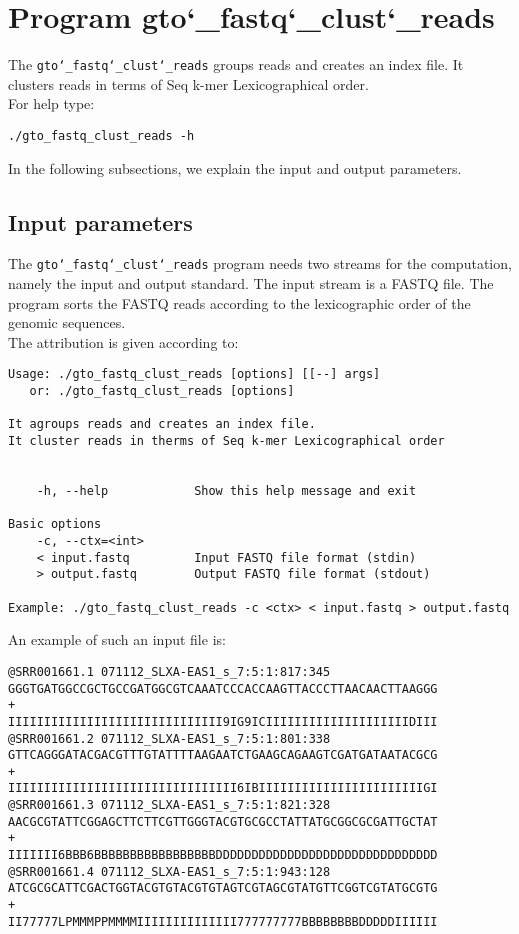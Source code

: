 \section{Program gto\char`_fastq\char`_clust\char`_reads}
The \texttt{gto\char`_fastq\char`_clust\char`_reads} groups reads and creates an index file. It clusters reads in terms of Seq k-mer Lexicographical order.\\
For help type:
\begin{lstlisting}
./gto_fastq_clust_reads -h
\end{lstlisting}
In the following subsections, we explain the input and output parameters.

\subsection*{Input parameters}

The \texttt{gto\char`_fastq\char`_clust\char`_reads} program needs two streams for the computation, namely the input and output standard. The input stream is a FASTQ file. The program sorts the FASTQ reads according to the lexicographic order of the genomic sequences.\\
The attribution is given according to:
\begin{lstlisting}
Usage: ./gto_fastq_clust_reads [options] [[--] args]
   or: ./gto_fastq_clust_reads [options]

It agroups reads and creates an index file.
It cluster reads in therms of Seq k-mer Lexicographical order


    -h, --help            Show this help message and exit

Basic options
    -c, --ctx=<int>       
    < input.fastq         Input FASTQ file format (stdin)
    > output.fastq        Output FASTQ file format (stdout)

Example: ./gto_fastq_clust_reads -c <ctx> < input.fastq > output.fastq
\end{lstlisting}
An example of such an input file is:
\begin{lstlisting}
@SRR001661.1 071112_SLXA-EAS1_s_7:5:1:817:345
GGGTGATGGCCGCTGCCGATGGCGTCAAATCCCACCAAGTTACCCTTAACAACTTAAGGG
+
IIIIIIIIIIIIIIIIIIIIIIIIIIIIII9IG9ICIIIIIIIIIIIIIIIIIIIIDIII
@SRR001661.2 071112_SLXA-EAS1_s_7:5:1:801:338
GTTCAGGGATACGACGTTTGTATTTTAAGAATCTGAAGCAGAAGTCGATGATAATACGCG
+
IIIIIIIIIIIIIIIIIIIIIIIIIIIIIIII6IBIIIIIIIIIIIIIIIIIIIIIIIGI
@SRR001661.3 071112_SLXA-EAS1_s_7:5:1:821:328
AACGCGTATTCGGAGCTTCTTCGTTGGGTACGTGCGCCTATTATGCGGCGCGATTGCTAT
+
IIIIIII6BBB6BBBBBBBBBBBBBBBBBDDDDDDDDDDDDDDDDDDDDDDDDDDDDDDD
@SRR001661.4 071112_SLXA-EAS1_s_7:5:1:943:128
ATCGCGCATTCGACTGGTACGTGTACGTGTAGTCGTAGCGTATGTTCGGTCGTATGCGTG
+
II77777LPMMMPPMMMMIIIIIIIIIIIIII777777777BBBBBBBBDDDDDIIIIII
\end{lstlisting}

